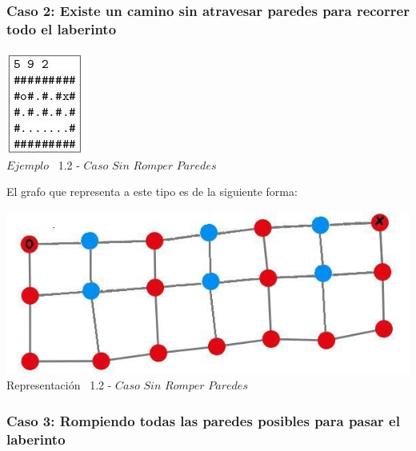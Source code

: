  \begin{center}
 \subsubsection*{Caso 2: Existe un camino sin atravesar paredes para recorrer todo el laberinto}
\end{center}
 
\vspace*{0.3cm} \vspace*{0.3cm}
  \begin{center}
 \includegraphics[scale=1.6]{./EJ1/ej1solucionsinpared.jpeg}
 \\{$Ejemplo$ \ 1.2 - $Caso$ $Sin$ $Romper$ $Paredes$}
  \end{center}
  \vspace*{0.3cm}

El grafo que representa a este tipo es de la siguiente forma:\\

\vspace*{0.3cm} \vspace*{0.3cm}
  \begin{center}
 \includegraphics[scale=0.5]{./EJ1/ej1grafosolucionsinpared.jpeg}
 \\{Representaci\'on \ 1.2 - $Caso$ $Sin$ $Romper$ $Paredes$}
  \end{center}
  \vspace*{0.3cm}

  
\begin{center}
 \subsubsection*{Caso 3: Rompiendo todas las paredes posibles para pasar el laberinto}
\end{center}
 
